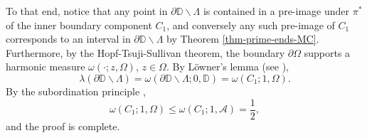 \documentclass[11pt,a4paper,reqno]{amsart}
\theoremstyle{plain}
\theoremstyle{definition}
\theoremstyle{plain}
\def\DD{\mathbb{D}}
\renewcommand{\setminus}{\smallsetminus}
\begin{document}
To that end, notice that any point in $\partial\DD\setminus\Lambda$ is contained in a pre-image under $\pi^*$ of the inner boundary component $C_1$, and conversely any such pre-image of $C_1$ corresponds to an interval in $\partial \DD\setminus\Lambda$ by Theorem \ref{thm-prime-ends-MC}. Furthermore, by the Hopf-Tsuji-Sullivan theorem, the boundary $\partial\Omega$ supports a harmonic measure $\omega(\cdot; z, \Omega)$, $z\in\Omega$. By Löwner's lemma (see \cite[Section XI.5]{Tsu75}),  $$\lambda (\partial\DD\setminus\Lambda)=\omega(\partial\DD\setminus\Lambda; 0, \DD) = \omega(C_1; 1, \Omega).$$  By the subordination principle \cite[Corol. 21.1.14]{Conway2}, $$\omega(C_1; 1, \Omega) \leq \omega(C_1; 1, \mathcal{A}) = \frac{1}{2},$$ and the proof is complete.

% 
% 
\end{document}

